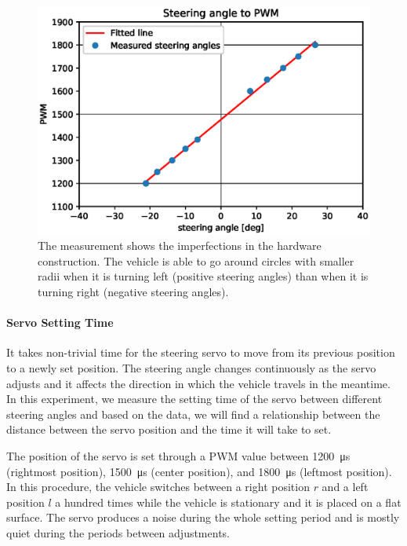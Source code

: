 \begin{figure}
	\includegraphics[width=\textwidth]{../img/steering_angle_to_pwm}
	\caption{The measurement shows the imperfections in the hardware construction. The vehicle is able to go around circles with smaller radii when it is turning left (positive steering angles) than when it is turning right (negative steering angles).}
	\label{fig:steering_angle_to_pwm}
\end{figure}

\paragraph{Servo Setting Time}

It takes non-trivial time for the steering servo to move from its previous position to a newly set position. The steering angle changes continuously as the servo adjusts and it affects the direction in which the vehicle travels in the meantime. In this experiment, we measure the setting time of the servo between different steering angles and based on the data, we will find a relationship between the distance between the servo position and the time it will take to set.

The position of the servo is set through a \gls{PWM} value between \SI{1200}{\micro\second} (rightmost position), \SI{1500}{\micro\second} (center position), and \SI{1800}{\micro\second} (leftmost position). In this procedure, the vehicle switches between a right position $r$ and a left position $l$ a hundred times while the vehicle is stationary and it is placed on a flat surface. The servo produces a noise during the whole setting period and is mostly quiet during the periods between adjustments.

